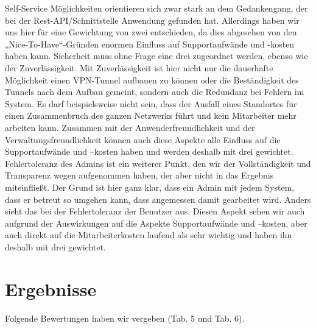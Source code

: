 Self-Service Möglichkeiten orientieren sich zwar stark an dem Gedankengang, der bei der Rest-API/Schnittstelle Anwendung gefunden hat. Allerdings haben wir uns hier für eine Gewichtung von zwei entschieden, da dies abgesehen von den „Nice-To-Have“-Gründen enormen Einfluss auf Supportaufwände und -kosten haben kann. Sicherheit muss ohne Frage eine drei zugeordnet werden, ebenso wie der Zuverlässigkeit. Mit Zuverlässigkeit ist hier nicht nur die dauerhafte Möglichkeit einen VPN-Tunnel aufbauen zu können oder die Beständigkeit des Tunnels nach dem Aufbau gemeint, sondern auch die Redundanz bei Fehlern im System. Es darf beispielsweise nicht sein, dass der Ausfall eines Standortes für einen Zusammenbruch des ganzen Netzwerks führt und kein Mitarbeiter mehr arbeiten kann. Zusammen mit der Anwenderfreundlichkeit und der Verwaltungsfreundlichkeit können auch diese Aspekte alle Einfluss auf die Supportaufwände und –kosten haben und werden deshalb mit drei gewichtet. Fehlertoleranz des Admins ist ein weiterer Punkt, den wir der Vollständigkeit und Transparenz wegen aufgenommen haben, der aber nicht in das Ergebnis miteinfließt. Der Grund ist hier ganz klar, dass ein Admin mit jedem System, dass er betreut so umgehen kann, dass angemessen damit gearbeitet wird. Anders sieht das bei der Fehlertoleranz der Benutzer aus. Diesen Aspekt sehen wir auch aufgrund der Auswirkungen auf die Aspekte Supportaufwände und –kosten, aber auch direkt auf die Mitarbeiterkosten laufend als sehr wichtig und haben ihn deshalb mit drei gewichtet.


\section{Ergebnisse} %
\label{sec:Ergebnisse}

Folgende Bewertungen haben wir vergeben (Tab. 5 und Tab. 6).

